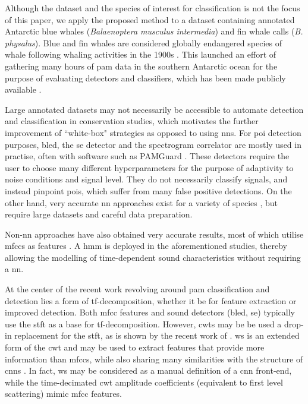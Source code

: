 Although the dataset and the species of interest for classification is not the focus of this paper, we apply the proposed method to a dataset containing annotated Antarctic blue whales (\textit{Balaenoptera musculus intermedia}) and fin whale calls (\textit{B. physalus}). Blue and fin whales are considered globally endangered species of whale following whaling activities in the 1900s \citep{blue_whale, fin_whale}. This launched an effort of gathering many hours of \ac{pam} data in the southern Antarctic ocean \citep{sorp_sohn} for the purpose of evaluating detectors and classifiers, which has been made publicly available \citep{casey2017}.


Large annotated datasets may not necessarily be accessible to automate detection and classification in conservation studies, which motivates the further improvement of ``white-box" strategies as opposed to using \acp{nn}. For \ac{poi} detection purposes, \ac{bled}, the \ac{se} detector and the spectrogram correlator \citep{casey2017} are mostly used in practise, often with software such as PAMGuard \citep{PAMGuard}. These detectors require the user to choose many different hyperparameters for the purpose of adaptivity to noise conditions and signal level. They do not necessarily classify signals, and instead pinpoint \acp{poi}, which suffer from many false positive detections. On the other hand, very accurate \ac{nn} approaches exist for a variety of species \citep{MLalexnet, cnn_multiple_whale_classes, narw_cn_denoising, cnn_fin_whale}, but require large datasets and careful data preparation.


Non-\ac{nn} approaches have also obtained very accurate results, most of which utilise \acp{mfcc} as features \citep{MFCC_HMM_birds, hmm2}. A \ac{hmm} is deployed in the aforementioned studies, thereby allowing the modelling of time-dependent sound characteristics without requiring a \ac{nn}.

At the center of the recent work revolving around \ac{pam} classification and detection lies a form of \ac{tf}-decomposition, whether it be for feature extraction or improved detection. Both \ac{mfcc} features and sound detectors (\ac{bled}, \ac{se}) typically use the \ac{stft} as a base for \ac{tf}-decomposition. However, \acp{cwt} may be be used a drop-in replacement for the \ac{stft}, as is shown by the recent work of \citet{mypaper}. \Ac{ws} is an extended form of the \ac{cwt} and may be used to extract features that provide more information than \acp{mfcc}, while also sharing many similarities with the structure of \acp{cnn} \citep{ws}. In fact, \ac{ws} may be considered as a manual definition of a \ac{cnn} front-end, while the time-decimated \ac{cwt} amplitude coefficients (equivalent to first level scattering) mimic \ac{mfcc} features.

